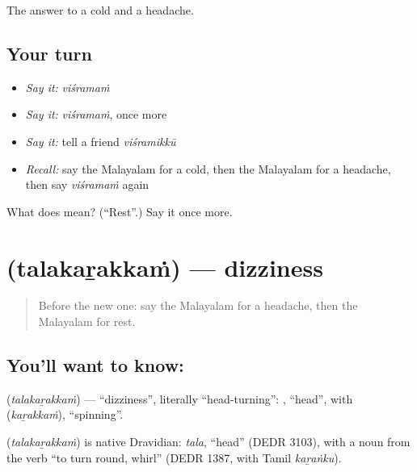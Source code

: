 \begin{grammarlens}[title={What you've built}]
The answer to a cold and a headache.
\end{grammarlens}

\subsection*{Your turn}
\begin{itemize}
\raggedright
  \item \emph{Say it:} \emph{viśramaṁ}
  \item \emph{Say it:} \emph{viśramaṁ}, once more
  \item \emph{Say it:} tell a friend \emph{viśramikkū}
  \item \emph{Recall:} say the Malayalam for a cold, then the Malayalam for a headache, then say \emph{viśramaṁ} again
\end{itemize}

\begin{tcolorbox}[breakable,colback=teal!4,colframe=teal!35!black,title={Before you move on}]
What does  mean? (\textquotedblleft{}Rest\textquotedblright{}.) Say it once more.
\end{tcolorbox}
\section[\texorpdfstring{\ml{തലകറക്കം} (talakaṟakkaṁ)}{തലകറക്കം (talakaṟakkaṁ)}]{ (talakaṟakkaṁ) — dizziness}

\label{lesson:ML-C115-dizzy}



\begin{quote}
Before the new one: say the Malayalam for a headache, then the Malayalam for rest.
\end{quote}

\subsection*{You'll want to know: }
\textbf{} (\emph{talakaṟakkaṁ}) — \textquotedblleft{}dizziness\textquotedblright{}, literally \textquotedblleft{}head-turning\textquotedblright{}: \textbf{}, \textquotedblleft{}head\textquotedblright{}, with \textbf{} (\emph{kaṟakkaṁ}), \textquotedblleft{}spinning\textquotedblright{}.

\begin{cousinweb}
\textbf{} (\emph{talakaṟakkaṁ}) is native Dravidian: \emph{tala}, \textquotedblleft{}head\textquotedblright{} (DEDR 3103), with a noun from the verb \textquotedblleft{}to turn round, whirl\textquotedblright{} (DEDR 1387, with Tamil \emph{kaṟaṅku}).
\end{cousinweb}

